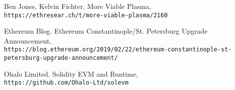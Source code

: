 \documentclass[letterpaper, 11pt]{article}
\begin{document}
\begin{thebibliography}{9}
 \label{ref:morevp}
Ben Jones, Kelvin Fichter. More Viable Plasma,
\\\texttt{https://ethresear.ch/t/more-viable-plasma/2160}

 \label{ref:constantinople}
Ethereum Blog. Ethereum Constantinople/St. Petersburg Upgrade Announcement,
\\\texttt{https://blog.ethereum.org/2019/02/22/ethereum-constantinople-st-petersburg-upgrade-announcement/}

 \label{ref:solevm}
Ohalo Limited. Solidity EVM and Runtime,
\\\texttt{https://github.com/Ohalo-Ltd/solevm}


\end{thebibliography}
\end{document}

